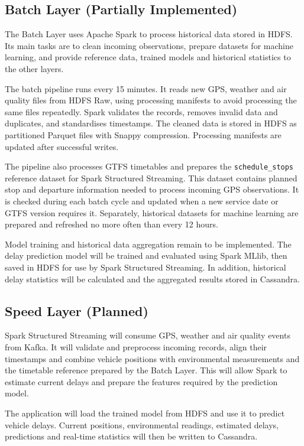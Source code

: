 \documentclass[11pt]{article}
\begin{document}
\subsection{Batch Layer (Partially Implemented)}

The Batch Layer uses Apache Spark to process historical data stored in HDFS. Its main tasks are to clean incoming observations, prepare datasets for machine learning, and provide reference data, trained models and historical statistics to the other layers.

The batch pipeline runs every 15 minutes. It reads new GPS, weather and air quality files from HDFS Raw, using processing manifests to avoid processing the same files repeatedly. Spark validates the records, removes invalid data and duplicates, and standardises timestamps. The cleaned data is stored in HDFS as partitioned Parquet files with Snappy compression. Processing manifests are updated after successful writes.

The pipeline also processes GTFS timetables and prepares the \texttt{schedule\_stops} reference dataset for Spark Structured Streaming. This dataset contains planned stop and departure information needed to process incoming GPS observations. It is checked during each batch cycle and updated when a new service date or GTFS version requires it. Separately, historical datasets for machine learning are prepared and refreshed no more often than every 12 hours.

Model training and historical data aggregation remain to be implemented. The delay prediction model will be trained and evaluated using Spark MLlib, then saved in HDFS for use by Spark Structured Streaming. In addition, historical delay statistics will be calculated and the aggregated results stored in Cassandra.

\subsection{Speed Layer (Planned)}

Spark Structured Streaming will consume GPS, weather and air quality events from Kafka. It will validate and preprocess incoming records, align their timestamps and combine vehicle positions with environmental measurements and the timetable reference prepared by the Batch Layer. This will allow Spark to estimate current delays and prepare the features required by the prediction model.

The application will load the trained model from HDFS and use it to predict vehicle delays. Current positions, environmental readings, estimated delays, predictions and real-time statistics will then be written to Cassandra.
\end{document}
